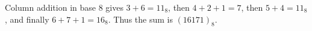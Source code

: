 Column addition in base 8 gives $3+6=11_8$, then $4+2+1=7$, then $5+4=11_8$, and finally $6+7+1=16_8$. Thus the sum is $\boxed{(16171)_8}$.

